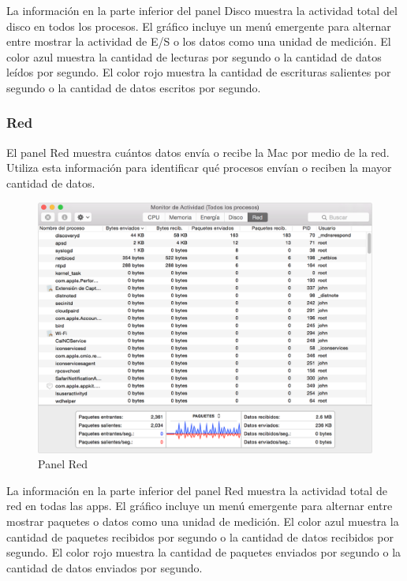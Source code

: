 \documentclass[a4paper,11pt]{article}
\begin{document}
La información en la parte inferior del panel Disco muestra la actividad total del disco en todos los procesos. El gráfico incluye un menú emergente para alternar entre mostrar la actividad de E/S o los datos como una unidad de medición. El color azul muestra la cantidad de lecturas por segundo o la cantidad de datos leídos por segundo. El color rojo muestra la cantidad de escrituras salientes por segundo o la cantidad de datos escritos por segundo.

\subsubsection{Red}

El panel Red muestra cuántos datos envía o recibe la Mac por medio de la red. Utiliza esta información para identificar qué procesos envían o reciben la mayor cantidad de datos.

\begin{figure}[H]
  \centering
  \includegraphics[width=1\textwidth]{05macActivityMonitorNetwork}
  \caption{Panel Red}
  \label{fig:macActivityMonitorNetwork}
\end{figure}

La información en la parte inferior del panel Red muestra la actividad total de red en todas las apps. El gráfico incluye un menú emergente para alternar entre mostrar paquetes o datos como una unidad de medición. El color azul muestra la cantidad de paquetes recibidos por segundo o la cantidad de datos recibidos por segundo. El color rojo muestra la cantidad de paquetes enviados por segundo o la cantidad de datos enviados por segundo.
\end{document}
